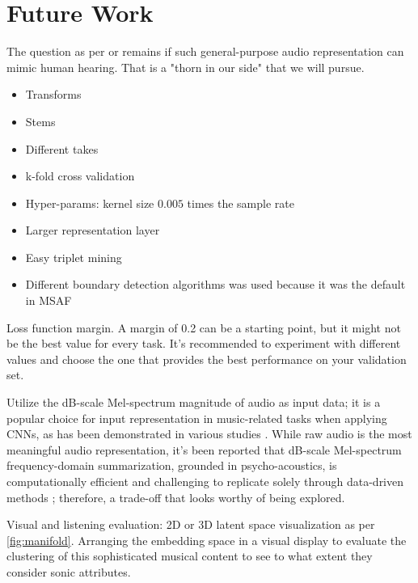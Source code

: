 \chapter{Future Work}

The question as per \cite{Turian2022HEAR:Representations} or \cite{Li2023MERT:Training} remains if such general-purpose audio representation can mimic human hearing. That is a "thorn in our side" that we will pursue.

\begin{itemize}
  \item Transforms
  \item Stems
  \item Different takes
  \item k-fold cross validation
  \item Hyper-params: kernel size $0.005$ times the sample rate
  \item Larger representation layer
  \item Easy triplet mining \cite{XuanImprovedMining}
  \item Different boundary detection algorithms \cite{sf} was used because it was the default in MSAF \cite{MSAF}
\end{itemize}

Loss function margin. A margin of 0.2 can be a starting point, but it might not be the best value for every task. It's recommended to experiment with different values and choose the one that provides the best performance on your validation set.

Utilize the dB-scale Mel-spectrum magnitude of audio as input data; it is a popular choice for input representation in music-related tasks when applying CNNs, as has been demonstrated in various studies \cite{Kim2020OneStrategies}. While raw audio is the most meaningful audio representation, it's been reported that dB-scale Mel-spectrum frequency-domain summarization, grounded in psycho-acoustics, is computationally efficient and challenging to replicate solely through data-driven methods \cite{Kim2020OneStrategies}; therefore, a trade-off that looks worthy of being explored.

Visual and listening evaluation: 2D or 3D latent space visualization as per \ref{fig:manifold}. Arranging the embedding space in a visual display to evaluate the clustering of this sophisticated musical content to see to what extent they consider sonic attributes. 



\newpage